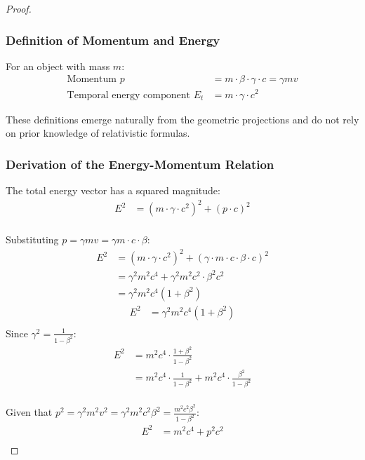 \documentclass{article}
\begin{document}
\begin{theorem}
\begin{proof}
\subsubsection{Definition of Momentum and Energy}

For an object with mass $m$:
\begin{align}
    \text{Momentum } p &= m \cdot \beta \cdot \gamma \cdot c = \gamma m v \\
    \text{Temporal energy component } E_t &= m \cdot \gamma \cdot c^2
\end{align}

These definitions emerge naturally from the geometric projections and do not rely on prior knowledge of relativistic formulas.

\subsubsection{Derivation of the Energy-Momentum Relation}

The total energy vector has a squared magnitude:
\begin{align}
    E^2 &= (m \cdot \gamma \cdot c^2)^2 + (p \cdot c)^2 \\
\end{align}

Substituting $p = \gamma m v = \gamma m \cdot c \cdot \beta$:
\begin{align}
    E^2 &= (m \cdot \gamma \cdot c^2)^2 + (\gamma \cdot m \cdot c \cdot \beta \cdot c)^2 \\
    &= \gamma^2 m^2 c^4 + \gamma^2 m^2 c^2 \cdot \beta^2 c^2 \\
    &= \gamma^2 m^2 c^4(1 + \beta^2)
\end{align}
\begin{align}
    E^2 &= \gamma^2 m^2 c^4(1 + \beta^2) \\
\end{align}
Since $\gamma^2 = \frac{1}{1-\beta^2}$:
\begin{align}
    E^2 &= m^2 c^4 \cdot \frac{1 + \beta^2}{1-\beta^2} \\
    &= m^2 c^4 \cdot \frac{1}{1-\beta^2} + m^2 c^4 \cdot \frac{\beta^2}{1-\beta^2} \\
\end{align}

Given that $p^2 = \gamma^2 m^2 v^2 = \gamma^2 m^2 c^2 \beta^2 = \frac{m^2 c^2 \beta^2}{1-\beta^2}$:
\begin{align}
    E^2 &= m^2 c^4 + p^2 c^2 \\
\end{align}


\end{proof}
\end{theorem}
\end{document}
